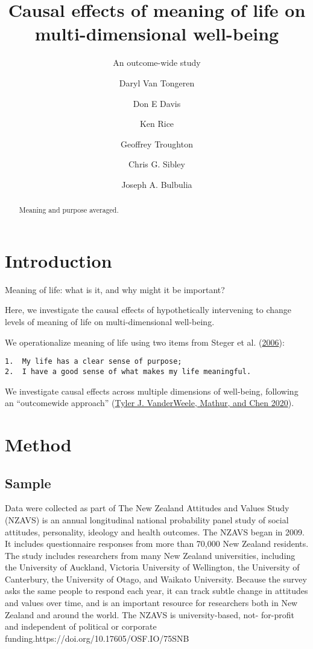 \documentclass[
  singlecolumn]{report}
\title{Causal effects of meaning of life on multi-dimensional
well-being}
\subtitle{An outcome-wide study}
\author{Daryl Van Tongeren \and Don E Davis \and Ken Rice \and Geoffrey
Troughton \and Chris G. Sibley \and Joseph A. Bulbulia}
\date{}
\begin{document}
\maketitle
\begin{abstract}
Meaning and purpose averaged.
\end{abstract}
\ifdefined\Shaded\renewenvironment{Shaded}{\begin{tcolorbox}[boxrule=0pt, sharp corners, borderline west={3pt}{0pt}{shadecolor}, frame hidden, breakable, enhanced, interior hidden]}{\end{tcolorbox}}\fi

\listoffigures
\listoftables
\hypertarget{introduction}{%
\section{Introduction}\label{introduction}}

Meaning of life: what is it, and why might it be important?

Here, we investigate the causal effects of hypothetically intervening to
change levels of meaning of life on multi-dimensional well-being.

We operationalize meaning of life using two items from Steger et al.
(\protect\hyperlink{ref-steger_meaning_2006}{2006}):

\begin{verbatim}
1.  My life has a clear sense of purpose;
2.  I have a good sense of what makes my life meaningful.
\end{verbatim}

We investigate causal effects across multiple dimensions of well-being,
following an ``outcomewide approach''
(\protect\hyperlink{ref-vanderweele2020}{Tyler J. VanderWeele, Mathur,
and Chen 2020}).

\hypertarget{method}{%
\section{Method}\label{method}}

\hypertarget{sample}{%
\subsection{Sample}\label{sample}}

Data were collected as part of The New Zealand Attitudes and Values
Study (NZAVS) is an annual longitudinal national probability panel study
of social attitudes, personality, ideology and health outcomes. The
NZAVS began in 2009. It includes questionnaire responses from more than
70,000 New Zealand residents. The study includes researchers from many
New Zealand universities, including the University of Auckland, Victoria
University of Wellington, the University of Canterbury, the University
of Otago, and Waikato University. Because the survey asks the same
people to respond each year, it can track subtle change in attitudes and
values over time, and is an important resource for researchers both in
New Zealand and around the world. The NZAVS is university-based, not-
for-profit and independent of political or corporate
funding.https://doi.org/10.17605/OSF.IO/75SNB
\end{document}

